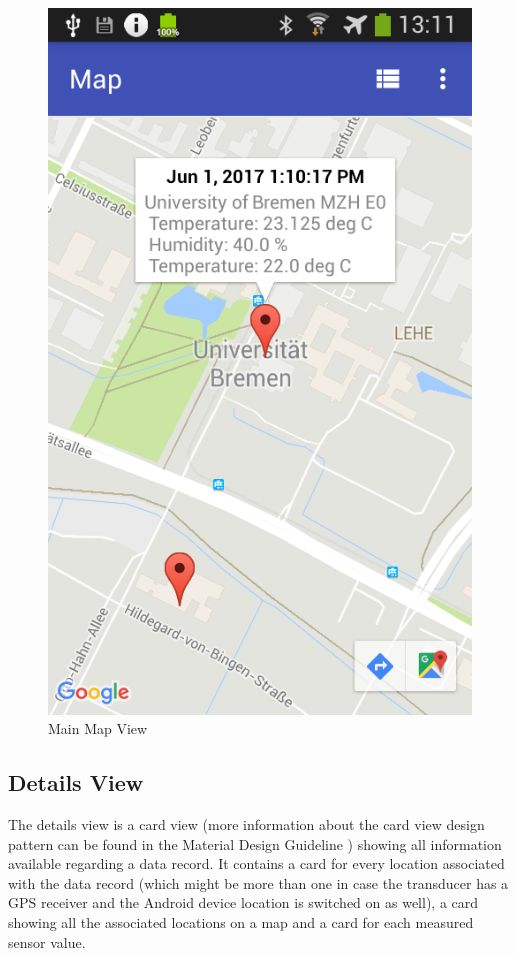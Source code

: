 \begin{figure}
\centering
\includegraphics[width=.4\linewidth]{src/main_map.png}
\caption{Main Map View}
\label{fig:main_maps_view}
\end{figure}

\subsection{Details View}
\label{subs:details-view}
The details view is a card view (more information about the card view design pattern can be found in the Material Design Guideline \cite{Material}) showing all information available regarding a data record. It contains a card for every location associated with the data record (which might be more than one in case the transducer has a GPS receiver and the Android device location is switched on as well), a card showing all the associated locations on a map and a card for each measured sensor value.

